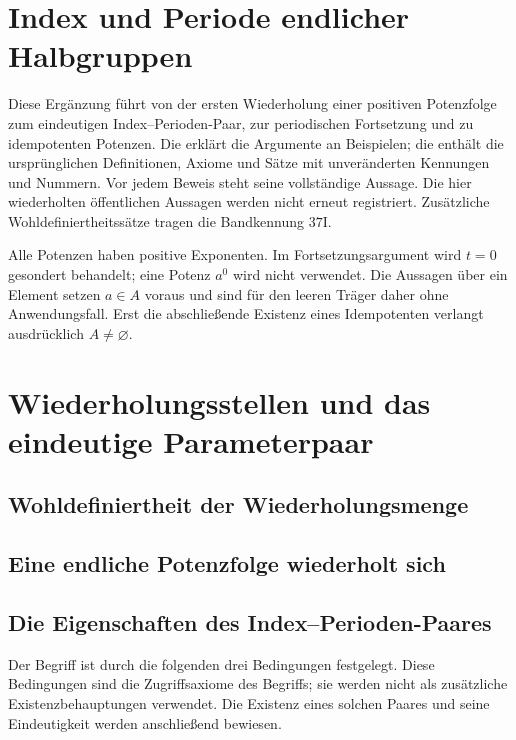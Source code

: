 \section*{Index und Periode endlicher Halbgruppen}
\hypertarget{index-period.proofs}{}
Diese Ergänzung führt von der ersten Wiederholung einer positiven Potenzfolge
zum eindeutigen Index--Perioden-Paar, zur periodischen Fortsetzung und zu
idempotenten Potenzen. Die \IndexPeriodReadingLink{} erklärt die Argumente
an Beispielen; die \IndexPeriodMainLink{} enthält die ursprünglichen
Definitionen, Axiome und Sätze mit unveränderten Kennungen und Nummern.
Vor jedem Beweis steht seine vollständige Aussage. Die hier wiederholten
öffentlichen Aussagen werden nicht erneut registriert. Zusätzliche
Wohldefiniertheitssätze tragen die Bandkennung \(37\mathrm I\).

Alle Potenzen haben positive Exponenten. Im Fortsetzungsargument wird
\(t=0\) gesondert behandelt; eine Potenz \(a^0\) wird nicht verwendet.
Die Aussagen über ein Element setzen \(a\in A\) voraus und sind für den
leeren Träger daher ohne Anwendungsfall. Erst die abschließende Existenz
eines Idempotenten verlangt ausdrücklich \(A\neq\varnothing\).

\section{Wiederholungsstellen und das eindeutige Parameterpaar}
\subsection{Wohldefiniertheit der Wiederholungsmenge}
\hypertarget{index-period.proof.FiniteSemigroupPowerRepetitionSetDef}{}


\subsection{Eine endliche Potenzfolge wiederholt sich}
\hypertarget{index-period.proof.FiniteSemigroupPowerRepetitionExists}{}


\subsection{Die Eigenschaften des Index--Perioden-Paares}
Der Begriff ist durch die folgenden drei Bedingungen festgelegt.
Diese Bedingungen sind die Zugriffsaxiome des Begriffs; sie werden nicht
als zusätzliche Existenzbehauptungen verwendet. Die Existenz eines solchen
Paares und seine Eindeutigkeit werden anschließend bewiesen.

